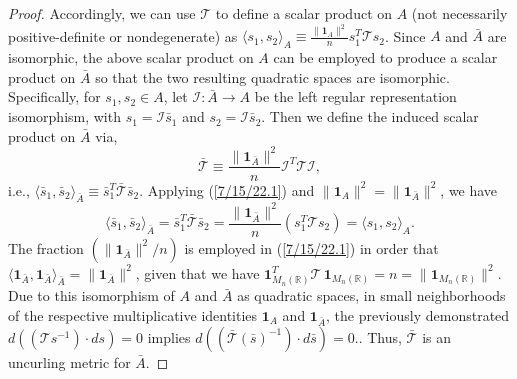 \documentclass{amsart}
\numberwithin{equation}{section}
\theoremstyle{definition}
\numberwithin{theorem}{section}
\begin{document}
\begin{proof}
   Accordingly, we can use $\mathcal{\mathcal{T}}$ to define a scalar product on $A$ (not necessarily positive-definite or nondegenerate) as $\langle s_1,s_2\rangle_A \equiv  \frac{\|\mathbf{1}_{A}\|^2}{n}s_1^T \mathcal{\mathcal{T}} s_2$. 
    Since $A$ and $\bar{A}$ are isomorphic, the above scalar product on $A$ can be employed to produce a scalar product on $\bar{A}$ so that the two resulting quadratic spaces are isomorphic.  Specifically,  for $s_1,s_2\in A$, let $ \mathcal{I}:\bar{A}\rightarrow A$ be the left regular representation isomorphism, with $s_1 = \mathcal{I}\bar{s}_1$ and $s_2= \mathcal{I}\bar{s}_2 $.  Then we define the induced scalar product on $\bar{A}$ via, \begin{equation}\label{7/15/22.1} \bar{\mathcal{\mathcal{T}}} \equiv  \frac{\|\mathbf{1}_{\bar{A}}\|^2}{n}\mathcal{I}^T\mathcal{\mathcal{T}}\mathcal{I},\end{equation} i.e., $\langle \bar{s}_1,\bar{s}_2\rangle_{\bar{A}} \equiv \bar{s}_1^T \bar{\mathcal{\mathcal{T}}} \bar{s}_2$.  Applying (\ref{7/15/22.1}) and $\|\mathbf{1}_A\|^2 = \|\mathbf{1}_{\bar{A}}\|^2$, we have \begin{equation}\label{8/25/22.1} \langle \bar{s}_1,\bar{s}_2\rangle_{\bar{A}} = \bar{s}_1^T \bar{\mathcal{T}} \bar{s}_2 = \frac{\|\mathbf{1}_{\bar{A}}\|^2}{n}( s_1^T \mathcal{T} s_2) = \langle s_1,s_2\rangle_{A}.\end{equation}  The fraction $(\|\mathbf{1}_{\bar{A}}\|^2/n)$ is employed in (\ref{7/15/22.1}) in order that $\langle \mathbf{1}_{\bar{A}},\mathbf{1}_{\bar{A}}\rangle_{\bar{A}} = \|\mathbf{1}_{\bar{A}}\|^2$, given that we have $\mathbf{1}_{M_n(\mathbb{R})}^T \mathcal{T}\,\mathbf{1}_{M_n(\mathbb{R})} = n = \|\mathbf{1}_{M_n(\mathbb{R})}\|^2$. Due to this isomorphism of $A$ and $\bar{A}$ as quadratic spaces,  in small neighborhoods of the respective multiplicative identities $\mathbf{1}_A$ and $\mathbf{1}_{\bar{A}}$, the previously demonstrated $d((\mathcal{T}s^{-1})\cdot ds) = 0$ implies 
\mbox{$d((\bar{\mathcal{T}}(\bar{s})^{-1})\cdot d\bar{s}) = 0$.}. Thus, $\bar{\mathcal{T}}$ is an uncurling metric for $\bar{A}$.



\end{proof}
\end{document}
